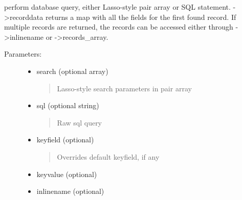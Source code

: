 \documentclass[letterpaper,10pt,english]{sphinxmanual}
\begin{document}
\begin{fulllineitems}
\begin{fulllineitems}
\end{fulllineitems}


\begin{fulllineitems}
\label{knop_database:knop_database.select}
\end{fulllineitems}


\begin{fulllineitems}
perform database query, either Lasso-style pair array or SQL statement.
-\textgreater{}recorddata returns a map with all the fields for the first found record. If
multiple records are returned, the records can be accessed either through
-\textgreater{}inlinename or -\textgreater{}records\_array.
\begin{description}
\item[{Parameters:}] \leavevmode\begin{itemize}
\item {} 
search (optional array)
\begin{quote}

Lasso-style search parameters in pair array
\end{quote}

\item {} 
sql (optional string)
\begin{quote}

Raw sql query
\end{quote}

\item {} 
keyfield (optional)
\begin{quote}

Overrides default keyfield, if any
\end{quote}

\item {} 
keyvalue (optional)

\item {} 
inlinename (optional)
\begin{quote}


\end{quote}
\end{itemize}
\end{description}
\end{fulllineitems}
\end{fulllineitems}
\end{document}
